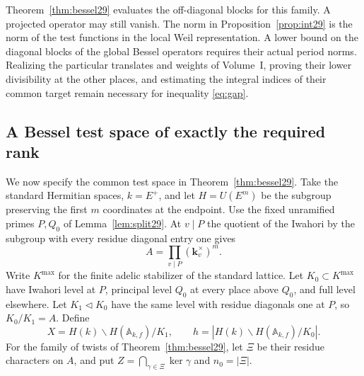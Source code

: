 \documentclass[a4paper,11pt]{article}
\theoremstyle{definition}
\theoremstyle{remark}
\numberwithin{equation}{section}
\begin{document}
Theorem~\ref{thm:bessel29} evaluates the off-diagonal blocks for this family. A projected operator may still vanish. The norm in Proposition~\ref{prop:int29} is the norm of the test functions in the local Weil representation. A lower bound on the diagonal blocks of the global Bessel operators requires their actual period norms. Realizing the particular translates and weights of Volume~I, proving their lower divisibility at the other places, and estimating the integral indices of their common target remain necessary for inequality \eqref{eq:gap}.

\subsection{A Bessel test space of exactly the required rank}\label{nav:I-47}
\label{sec:target32}

We now specify the common test space in Theorem~\ref{thm:bessel29}. Take the standard Hermitian spaces, \(k=E^+\), and let \(H=U(E^m)\) be the subgroup preserving the first \(m\) coordinates at the endpoint. Use the fixed unramified primes \(P,Q_0\) of Lemma~\ref{lem:split29}. At \(v\mid P\) the quotient of the Iwahori by the subgroup with every residue diagonal entry one gives
\[
 A=\prod_{v\mid P}(\mathbf k_v^\times)^m .
\]
Write \(K^{\max}\) for the finite adelic stabilizer of the standard lattice. Let \(K_0\subset K^{\max}\) have Iwahori level at \(P\), principal level \(Q_0\) at every place above \(Q_0\), and full level elsewhere. Let \(K_1\triangleleft K_0\) have the same level with residue diagonals one at \(P\), so \(K_0/K_1=A\). Define
\[
 X=H(k)\backslash H(\mathbb A_{k,f})/K_1,\qquad
 h=|H(k)\backslash H(\mathbb A_{k,f})/K_0|.
\]
For the family of twists of Theorem~\ref{thm:bessel29}, let \(\Xi\) be their residue characters on \(A\), and put \(Z=\bigcap_{\gamma\in\Xi}\ker\gamma\) and \(n_0=|\Xi|\).
\end{document}
